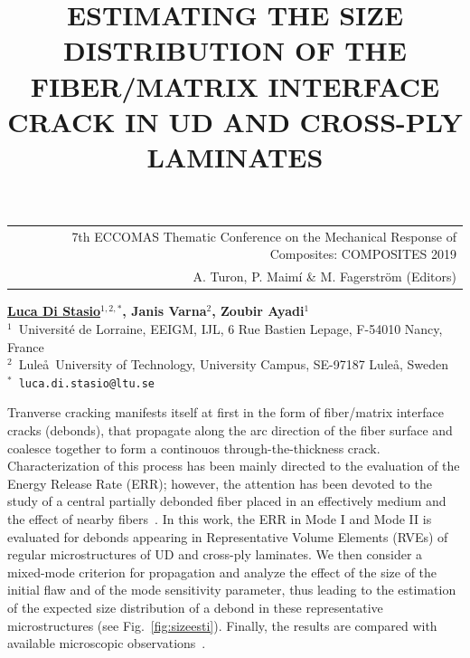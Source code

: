 \documentclass[12pt,a4paper]{article}
\begin{document}
\thispagestyle{empty}

\vspace*{-3.4cm}
\begin{table}[!h]
\begin{tabular}{r}
\hspace*{2.9cm} \scriptsize \textsf{7th ECCOMAS Thematic Conference on the Mechanical Response of Composites: COMPOSITES 2019} \\
\hspace*{2.9cm} \tiny \textsf{A. Turon, P. Maimí \& M. Fagerström (Editors)}
\end{tabular}
\end{table}

\vspace*{-0.7cm}

\begin{center}
\title{ESTIMATING THE SIZE DISTRIBUTION OF THE FIBER/MATRIX INTERFACE CRACK IN UD AND CROSS-PLY LAMINATES}
\end{center}
\begin{center}
\textbf{\underline{Luca Di Stasio}$^{1,2,*}$, Janis Varna$^{2}$, Zoubir Ayadi$^{1}$} \\ [7pt]
\small{$^1$~Universit\'e de Lorraine, EEIGM, IJL, 6 Rue Bastien Lepage, F-54010 Nancy, France}  \\  [2pt]
\small{$^2$~Lule\aa\ University of Technology, University Campus, SE-97187 Lule\aa, Sweden}  \\  [2pt]
\small{$^*$~\texttt{luca.di.stasio@ltu.se}} \\
\end{center}

\noindent
Tranverse cracking manifests itself at first in the form of fiber/matrix interface cracks (debonds), that propagate along the arc direction of the fiber surface and coalesce together to form a continouos through-the-thickness crack. Characterization of this process has been mainly directed to the evaluation of the Energy Release Rate (ERR); however, the attention has been devoted to the study of a central partially debonded fiber placed in an effectively medium and the effect of nearby fibers~\cite{Sandino2016}. In this work, the ERR in Mode I and Mode II is evaluated for debonds appearing in Representative Volume Elements (RVEs) of regular microstructures of UD and cross-ply laminates. We then consider a mixed-mode criterion for propagation and analyze the effect of the size of the initial flaw and of the mode sensitivity parameter, thus leading to the estimation of the expected size distribution of a debond in these representative microstructures (see Fig.~\ref{fig:sizeesti}). Finally, the results are compared with available microscopic observations~\cite{Correa2018}.
\end{document}
